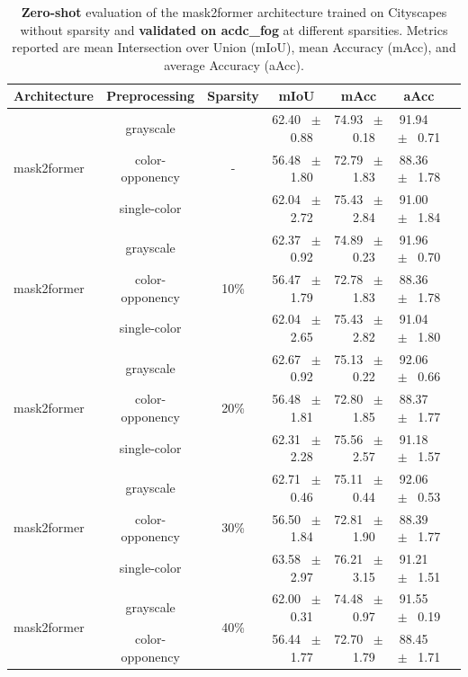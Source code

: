 \begin{table}[h]
  \centering
  \caption{\textbf{Zero-shot} evaluation of the mask2former architecture trained on Cityscapes without sparsity and \textbf{validated on acdc_fog} at different sparsities. Metrics reported are mean Intersection over Union (mIoU), mean Accuracy (mAcc), and average Accuracy (aAcc).}
  \begin{tabular}{@{}lccc ccc@{}}
    \toprule
    Architecture & Preprocessing & Sparsity & mIoU & mAcc & aAcc \\
    \midrule
    \multirow{3}{*}{mask2former} & grayscale & \multirow{3}{*}{-} & 62.40 ~$\pm$~ 0.88 & 74.93 ~$\pm$~ 0.18 & 91.94 ~$\pm$~ 0.71 \\
    & color-opponency &  & 56.48 ~$\pm$~ 1.80 & 72.79 ~$\pm$~ 1.83 & 88.36 ~$\pm$~ 1.78 \\
    & single-color &  & 62.04 ~$\pm$~ 2.72 & 75.43 ~$\pm$~ 2.84 & 91.00 ~$\pm$~ 1.84 \\
    \midrule
    \multirow{3}{*}{mask2former} & grayscale & \multirow{3}{*}{10\%} & 62.37 ~$\pm$~ 0.92 & 74.89 ~$\pm$~ 0.23 & 91.96 ~$\pm$~ 0.70 \\
    & color-opponency &  & 56.47 ~$\pm$~ 1.79 & 72.78 ~$\pm$~ 1.83 & 88.36 ~$\pm$~ 1.78 \\
    & single-color &  & 62.04 ~$\pm$~ 2.65 & 75.43 ~$\pm$~ 2.82 & 91.04 ~$\pm$~ 1.80 \\
    \midrule
    \multirow{3}{*}{mask2former} & grayscale & \multirow{3}{*}{20\%} & 62.67 ~$\pm$~ 0.92 & 75.13 ~$\pm$~ 0.22 & 92.06 ~$\pm$~ 0.66 \\
    & color-opponency &  & 56.48 ~$\pm$~ 1.81 & 72.80 ~$\pm$~ 1.85 & 88.37 ~$\pm$~ 1.77 \\
    & single-color &  & 62.31 ~$\pm$~ 2.28 & 75.56 ~$\pm$~ 2.57 & 91.18 ~$\pm$~ 1.57 \\
    \midrule
    \multirow{3}{*}{mask2former} & grayscale & \multirow{3}{*}{30\%} & 62.71 ~$\pm$~ 0.46 & 75.11 ~$\pm$~ 0.44 & 92.06 ~$\pm$~ 0.53 \\
    & color-opponency &  & 56.50 ~$\pm$~ 1.84 & 72.81 ~$\pm$~ 1.90 & 88.39 ~$\pm$~ 1.77 \\
    & single-color &  & 63.58 ~$\pm$~ 2.97 & 76.21 ~$\pm$~ 3.15 & 91.21 ~$\pm$~ 1.51 \\
    \midrule
    \multirow{3}{*}{mask2former} & grayscale & \multirow{3}{*}{40\%} & 62.00 ~$\pm$~ 0.31 & 74.48 ~$\pm$~ 0.97 & 91.55 ~$\pm$~ 0.19 \\
    & color-opponency &  & 56.44 ~$\pm$~ 1.77 & 72.70 ~$\pm$~ 1.79 & 88.45 ~$\pm$~ 1.71 \\

\end{tabular}
\end{table}
